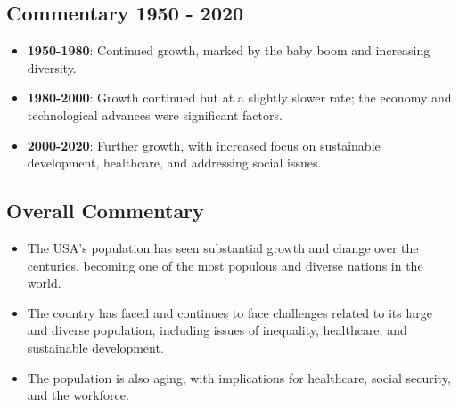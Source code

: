 \subsection*{Commentary 1950 - 2020}
\begin{itemize}
    \item \textbf{1950-1980}: Continued growth, marked by the baby boom and increasing diversity.
    \item \textbf{1980-2000}: Growth continued but at a slightly slower rate; the economy and technological advances were significant factors.
    \item \textbf{2000-2020}: Further growth, with increased focus on sustainable development, healthcare, and addressing social issues.
\end{itemize}

\subsection*{Overall Commentary}
\begin{itemize}
    \item The USA’s population has seen substantial growth and change over the centuries, becoming one of the most populous and diverse nations in the world.
    \item The country has faced and continues to face challenges related to its large and diverse population, including issues of inequality, healthcare, and sustainable development.
    \item The population is also aging, with implications for healthcare, social security, and the workforce.
\end{itemize}